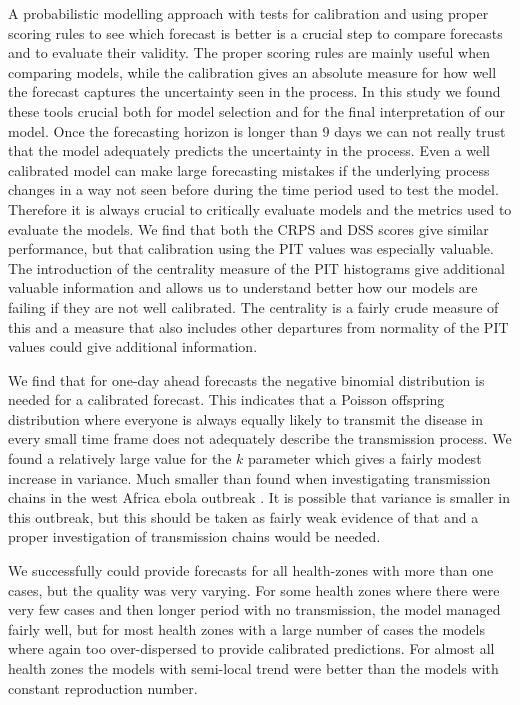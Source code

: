\documentclass[12pt]{article}
\begin{document}
A probabilistic modelling approach with tests for calibration and using proper scoring rules to see which forecast is better is a crucial step to compare forecasts and to evaluate their validity. The proper scoring rules are mainly useful when comparing models, while the calibration gives an absolute measure for how well the forecast captures the uncertainty seen in the process. In this study we found these tools crucial both for model selection and for the final interpretation of our model. Once the forecasting horizon is longer than 9 days we can not really trust that the model adequately predicts the uncertainty in the process. Even a well calibrated model can make large forecasting mistakes if the underlying process changes in a way not seen before during the time period used to test the model. Therefore it is always crucial to critically evaluate models and the metrics used to evaluate the models. We find that both the CRPS and DSS scores give similar performance, but that calibration using the PIT values was especially valuable. The introduction of the centrality measure of the PIT histograms give additional valuable information and allows us to understand better how our models are failing if they are not well calibrated. The centrality is a fairly crude measure of this and a measure that also includes other departures from normality of the PIT values could give additional information. 

We find that for one-day ahead forecasts the negative binomial distribution is needed for a calibrated forecast. This indicates that a Poisson offspring distribution where everyone is always equally likely to transmit the disease in every small time frame does not adequately describe the transmission process. We found a relatively large value for the $k$ parameter which gives a fairly modest increase in variance. Much smaller than found when investigating transmission chains in the west Africa ebola outbreak \cite{internationalebolaresponseteamExposurePatternsDriving2016}. It is possible that variance is smaller in this outbreak, but this should be taken as fairly weak evidence of that and a proper investigation of transmission chains would be needed. 

We successfully could provide forecasts for all health-zones with more than one cases, but the quality was very varying. For some health zones where there were very few cases and then longer period with no transmission, the model managed fairly well, but for most health zones with a large number of cases the models where again too over-dispersed to provide calibrated predictions. For almost all health zones the models with semi-local trend were better than the models with constant reproduction number. 
\end{document}
